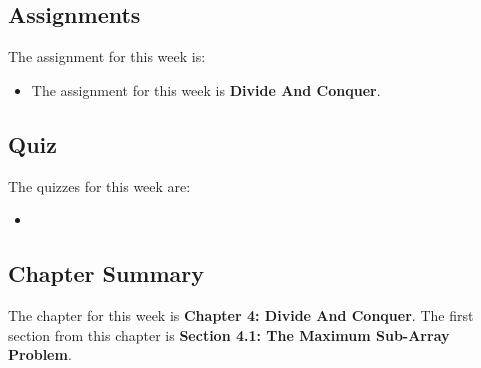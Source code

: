 \subsection{Assignments}

The assignment for this week is:

\begin{itemize}
    \item The assignment for this week is \textbf{Divide And Conquer}. 
\end{itemize}

\subsection{Quiz}

The quizzes for this week are:

\begin{itemize}
    \item {} \textbullet {} 
\end{itemize}

\subsection{Chapter Summary}

The chapter for this week is \textbf{Chapter 4: Divide And Conquer}. The first section from this chapter is \textbf{Section 4.1: The Maximum Sub-Array Problem}.


